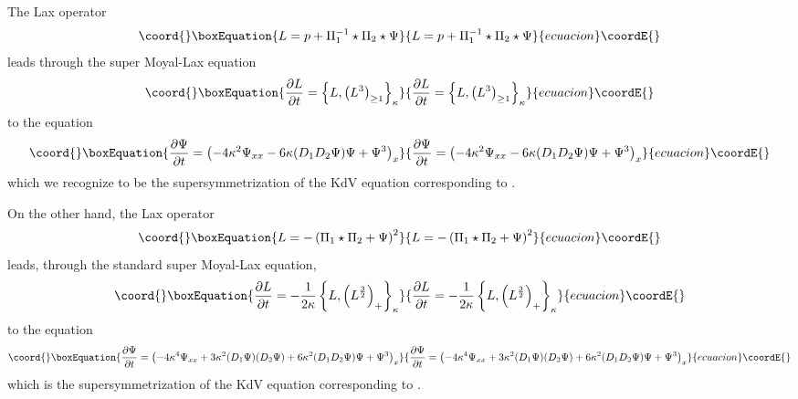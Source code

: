 \documentclass[a4paper,11pt]{article}
\begin{document}
The Lax operator
\begin{equation}\coord{}\boxEquation{
L = p + \Pi_{1}^{-1}\star \Pi_{2}\star \Psi
}{
L = p + \Pi_{1}^{-1}\star \Pi_{2}\star \Psi
}{ecuacion}\coordE{}\end{equation}
leads through the super Moyal-Lax equation
\begin{equation}\coord{}\boxEquation{
{\partial L\over \partial t} = \left\{L, \left(L^{3}\right)_{\geq
1}\right\}_{\kappa}
}{
{\partial L\over \partial t} = \left\{L, \left(L^{3}\right)_{\geq
1}\right\}_{\kappa}
}{ecuacion}\coordE{}\end{equation}
to the equation
\begin{equation}\coord{}\boxEquation{
{\partial \Psi\over \partial t} = \left(-4\kappa^{2} \Psi_{xx} -
6\kappa (D_{1}D_{2}\Psi) \Psi + \Psi^{3}\right)_{x}
}{
{\partial \Psi\over \partial t} = \left(-4\kappa^{2} \Psi_{xx} -
6\kappa (D_{1}D_{2}\Psi) \Psi + \Psi^{3}\right)_{x}
}{ecuacion}\coordE{}\end{equation}
which we recognize to be the \coordHE{} supersymmetrization of the KdV
equation corresponding to \coordHE{} \cite{6}.

On the other hand, the Lax operator
\begin{equation}\coord{}\boxEquation{
L = - \left(\Pi_{1}\star \Pi_{2} + \Psi\right)^{2}\label{20}
}{
L = - \left(\Pi_{1}\star \Pi_{2} + \Psi\right)^{2}}{ecuacion}\coordE{}\end{equation}
leads, through the standard super Moyal-Lax equation,
\begin{equation}\coord{}\boxEquation{
{\partial L\over \partial t} = -{1\over 2\kappa} \left\{L,
\left(L^{3\over 2}\right)_{+}\right\}_{\kappa}
}{
{\partial L\over \partial t} = -{1\over 2\kappa} \left\{L,
\left(L^{3\over 2}\right)_{+}\right\}_{\kappa}
}{ecuacion}\coordE{}\end{equation}
to the equation
\begin{equation}\coord{}\boxEquation{
{\partial \Psi\over \partial t} = \left(-4\kappa^{4} \Psi_{xx} +
3\kappa^{2} (D_{1}\Psi) (D_{2}\Psi) + 6\kappa^{2} (D_{1}D_{2}\Psi)
\Psi + \Psi^{3}\right)_{x}
}{
{\partial \Psi\over \partial t} = \left(-4\kappa^{4} \Psi_{xx} +
3\kappa^{2} (D_{1}\Psi) (D_{2}\Psi) + 6\kappa^{2} (D_{1}D_{2}\Psi)
\Psi + \Psi^{3}\right)_{x}
}{ecuacion}\coordE{}\end{equation}
which is the \coordHE{} supersymmetrization of the KdV equation
corresponding to \coordHE{} \cite{3}.
\end{document}
